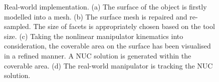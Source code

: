 \documentclass[lettersize,journal]{IEEEtran}
\begin{document}
\begin{figure}[t]
\centering
{}
\caption{Real-world implementation. 
(a) The surface of the object is firstly modelled into a mesh. 
(b) The surface mesh is repaired and re-sampled. The size of facets is appropriately chosen based on the tool size. 
(c) Taking the nonlinear manipulator kinematics into consideration, the coverable area on the surface has been visualised in a refined manner. 
A NUC solution is generated within the coverable area. 
(d) The real-world manipulator is tracking the NUC solution. 
}\label{fig:exp_real_world}
\end{figure}
\end{document}
